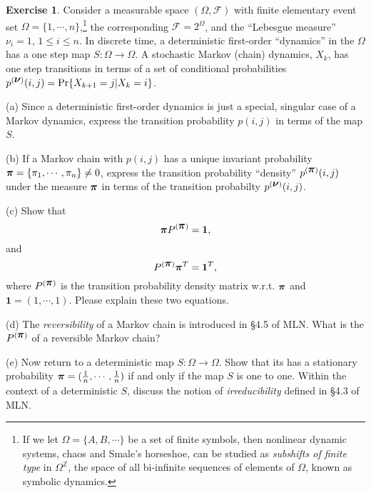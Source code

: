 \documentclass[12pt]{article}
\theoremstyle{definition}
\newtheorem{exer}{Exercise}
\theoremstyle{remark}
\def\vnu{\mbox{\boldmath$\nu$}}
\def\vpi{\mbox{\boldmath$\pi$}}
\begin{document}
\begin{exer}
Consider a measurable space $(\Omega,\mathcal{F})$
with finite elementary event set $\Omega=\{1,\cdots,n\}$,\footnote{If we let
$\Omega=\{A,B,\cdots\}$ be a set of finite symbols, then nonlinear dynamic systems, 
chaos and Smale's horseshoe, can be studied as {\em subshifts of finite type} in $\Omega^{\mathbb{Z}}$, the space of all bi-infinite sequences of elements of 
$\Omega$, known as symbolic dynamics.
} 
the corresponding $\mathcal{F}=2^\Omega$, and the ``Lebesgue measure''
$\nu_i = 1$, $1\le i\le n$.  In discrete time, a deterministic first-order
``dynamics''  in the $\Omega$ has a one step map $S:\Omega\to\Omega$.  
A stochastic Markov (chain) dynamics, $X_k$, has one step transitions in terms of a set of 
conditional probabilities $p^{(\vnu)}(i,j) = \Pr\{X_{k+1}=j|X_k=i\}$.

\vspace{0.5em}

(a) Since a deterministic first-order dynamics is just a special, singular case of 
a Markov dynamics, express the transition probability $p(i,j)$ in terms of the
map $S$.

(b) If a Markov chain with $p(i,j)$ has a unique invariant probability 
$\vpi=\{\pi_1,\cdots,\pi_n\}\neq 0$, express the transition probability ``density''
$p^{(\vpi)}(i,j)$ under the measure $\vpi$ in terms of the
transition probabilty $p^{(\vnu)}(i,j)$.

(c)  Show that 
\[
           \vpi P^{(\vpi)}  = \mathbf{1},
\]
and
\[
       P^{(\vpi)} \vpi^T = \mathbf{1}^T,
\]
where $P^{(\vpi)} $ is the transition probability density matrix w.r.t. $\vpi$
and $\mathbf{1}=(1,\cdots,1)$.
Please explain these two equations.

(d) The {\em reversibility} of a Markov chain is introduced in \S4.5 of MLN.
What is the $P^{(\vpi)}$ of a reversible Markov chain?

(e)  Now return to a deterministic map $S:\Omega\to\Omega$.  Show that
its has a stationary  probability $\vpi=(\tfrac{1}{n},\cdots,\tfrac{1}{n})$ 
if and only if the map $S$ is one to one.  
Within the context of a deterministic $S$,
discuss the notion of {\em irreducibility} defined in \S4.3 of MLN.
\end{exer}
\end{document}
